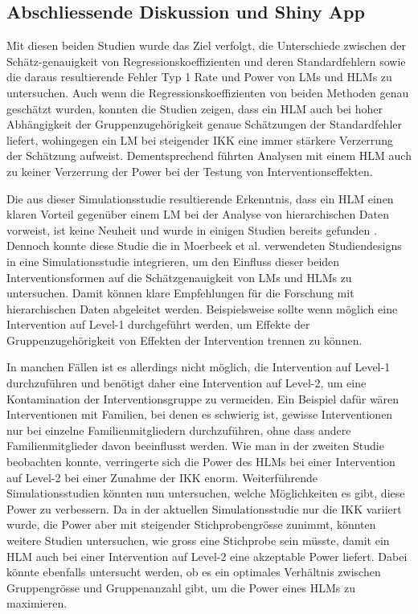 \documentclass[12pt, a4paper]{article}\usepackage[]{graphicx}\usepackage[]{color}
\begin{document}
\subsection{Abschliessende Diskussion und Shiny App}
Mit diesen beiden Studien wurde das Ziel verfolgt, die Unterschiede zwischen der Schätz-genauigkeit von Regressionskoeffizienten und deren Standardfehlern sowie die daraus resultierende Fehler Typ 1 Rate und Power von LMs und HLMs zu untersuchen. Auch wenn die Regressionskoeffizienten von beiden Methoden genau geschätzt wurden, konnten die Studien zeigen, dass ein HLM auch bei hoher Abhängigkeit der Gruppenzugehörigkeit genaue Schätzungen der Standardfehler liefert, wohingegen ein LM bei steigender IKK eine immer stärkere Verzerrung der Schätzung aufweist. Dementsprechend führten Analysen mit einem HLM auch zu keiner Verzerrung der Power bei der Testung von Interventionseffekten.

Die aus dieser Simulationsstudie resultierende Erkenntnis, dass ein HLM einen klaren Vorteil gegenüber einem LM bei der Analyse von hierarchischen Daten vorweist, ist keine Neuheit und wurde in einigen Studien bereits gefunden \citep{mcneish2014analyzing, MOERBEEK2003341, mundfrom2002monte, osborne2000advantages}. Dennoch konnte diese Studie die in Moerbeek et al. \citeyearpar{MOERBEEK2003341} verwendeten Studiendesigns in eine Simulationsstudie integrieren, um den Einfluss dieser beiden Interventionsformen auf die Schätzgenauigkeit von LMs und HLMs zu untersuchen. Damit können klare Empfehlungen für die Forschung mit hierarchischen Daten abgeleitet werden. Beispielsweise sollte wenn möglich eine Intervention auf Level-1 durchgeführt werden, um Effekte der Gruppenzugehörigkeit von Effekten der Intervention trennen zu können. 

In manchen Fällen ist es allerdings nicht möglich, die Intervention auf Level-1 durchzuführen und benötigt daher eine Intervention auf Level-2, um eine Kontamination der Interventionsgruppe zu vermeiden. Ein Beispiel dafür wären Interventionen mit Familien, bei denen es schwierig ist, gewisse Interventionen nur bei einzelne Familienmitgliedern durchzuführen, ohne dass andere Familienmitglieder davon beeinflusst werden. Wie man in der zweiten Studie beobachten konnte, verringerte sich die Power des HLMs bei einer Intervention auf Level-2 bei einer Zunahme der IKK enorm. Weiterführende Simulationsstudien könnten nun untersuchen, welche Möglichkeiten es gibt, diese Power zu verbessern. Da in der aktuellen Simulationsstudie nur die IKK variiert wurde, die Power aber mit steigender Stichprobengrösse zunimmt, könnten weitere Studien untersuchen, wie gross eine Stichprobe sein müsste, damit ein HLM auch bei einer Intervention auf Level-2 eine akzeptable Power liefert. Dabei könnte ebenfalls untersucht werden, ob es ein optimales Verhältnis zwischen Gruppengrösse und Gruppenanzahl gibt, um die Power eines HLMs zu maximieren.
\end{document}
